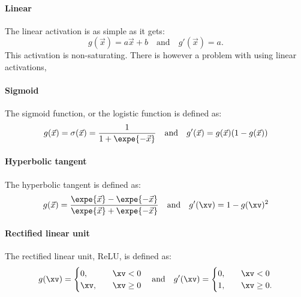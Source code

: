         \paragraph{Linear}
            The linear activation is as simple as it gets:
            \begin{equation}\label{eq:ML:NN:activation:linear}
                g(\vec{x}) = a\vec{x} + b \quad \mathrm{and} \quad g'(\vec{x}) = a.
            \end{equation}
            This activation is non-saturating. There is however a problem with using linear activations, 

        \paragraph{Sigmoid}
            The sigmoid function, or the logistic function is defined as: 
            \begin{equation}\label{eq:ML:NN:activation:sigmoid}
                g(\vec{x}) = \sigma(\vec{x}) = \frac{1}{1+\expe{-\vec{x}}} \quad \mathrm{and} \quad g'(\vec{x}) = g(\vec{x})(1-g(\vec{x}))
            \end{equation}


        \paragraph{Hyperbolic tangent}
            The hyperbolic tangent is defined as:
            \begin{equation}\label{eq:ML:NN:activation:tanh}
                g(\vec{x}) = \frac{\expe{\vec{x}}-\expe{-\vec{x}}}{\expe{\vec{x}}+\expe{-\vec{x}}} \quad \mathrm{and} \quad g'(\xv)=1-g(\xv)^2
            \end{equation}

        \paragraph{Rectified linear unit}
            The rectified linear unit, ReLU, is defined as:
            \begin{equation}\label{eq:ML:NN:activation:relu}
                g(\xv) = 
                \begin{cases}
                    0, \quad & \xv < 0 \\
                    \xv, \quad & \xv \geq 0
                \end{cases}
                \quad \mathrm{and} \quad
                g'(\xv) = 
                \begin{cases}
                    0, \quad & \xv < 0 \\
                    1, \quad & \xv \geq 0.
                \end{cases}
            \end{equation}

